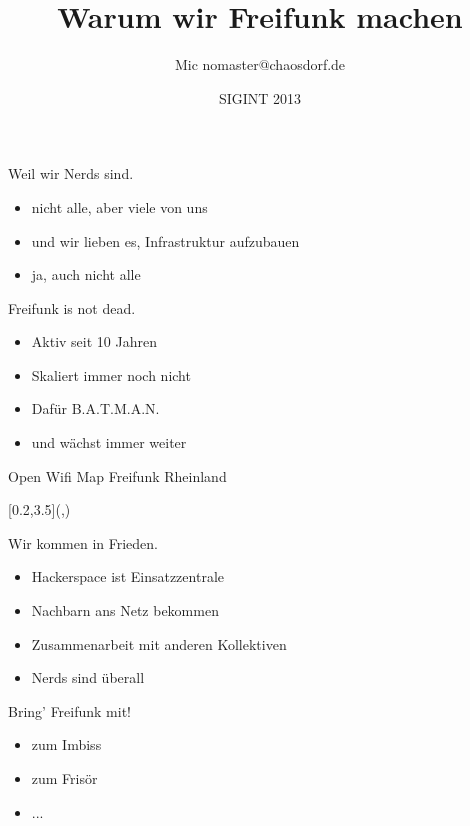 \documentclass[aspectratio=1610]{beamer}
\title[Warum wir Freifunk machen]{Warum wir Freifunk machen}
\author[nomaster]{Mic \flq nomaster@chaosdorf.de\frq}
\institute{Freifunk Düsseldorf}
\date[SIGINT13]{SIGINT 2013}
\newcommand{\boxx}[1]{
  {#1}
}
\newcommand{\photoby}[1]{
  \begin{textblock*}{\paperwidth}[0.2,3.5](\textwidth,\textheight)
    \raggedright{
      \tiny{
        \colorbox{black}{
        \color{white}{#1}
      }
      }
    }
  \end{textblock*}
}
\newcommand{\photo}[3]{
  {
    \usebackgroundtemplate{
      \texttt{[image: \#2]}
    }
    \begin{frame}{\boxx{#1}}
      \photoby{#3}
    \end{frame}
  }
}
\begin{document}
\huge

\begin{frame}
  \titlepage
\end{frame}


\begin{frame}{Weil wir Nerds sind.}
  \begin{itemize}
    \pause
    \item nicht alle, aber viele von uns
    \pause
    \item und wir lieben es, Infrastruktur aufzubauen
    \pause
    \item ja, auch nicht alle
  \end{itemize}
\end{frame}

\begin{frame}{Freifunk is not dead.}
  \begin{itemize}
      \pause
      \item Aktiv seit 10 Jahren
      \pause
      \item Skaliert immer noch nicht
      \pause
      \item Dafür B.A.T.M.A.N.
      \pause
      \item und wächst immer weiter
  \end{itemize}
\end{frame}

\photo{Open Wifi Map \tiny Freifunk Rheinland}{img/map.jpg}{map.freifunk-rheinland.net}

\begin{frame}{Wir kommen in Frieden.}
  \begin{itemize}
    \pause
    \item Hackerspace ist Einsatzzentrale
    \pause
    \item Nachbarn ans Netz bekommen
    \pause
    \item Zusammenarbeit mit anderen Kollektiven
    \pause
    \item Nerds sind überall
  \end{itemize}
\end{frame}

\begin{frame}{Bring’ Freifunk mit!}
  \begin{itemize}
    \pause
    \item zum Imbiss
    \item zum Frisör
    \item ...
  \end{itemize}
\end{frame}
\end{document}
